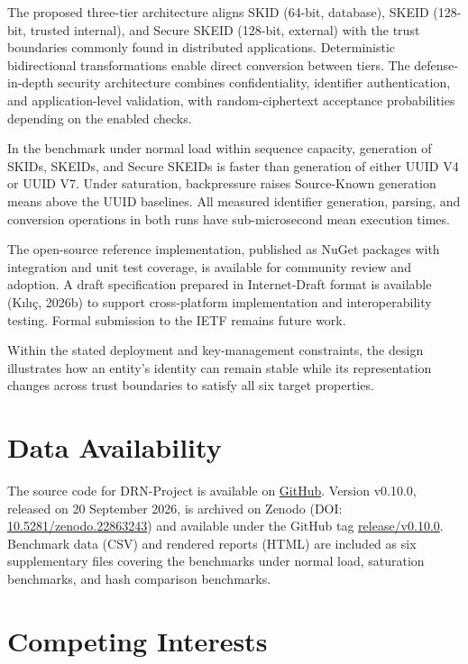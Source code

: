 \documentclass[fleqn,10pt]{wlpeerj}
\begin{document}
The proposed three-tier architecture aligns SKID (64-bit, database),
SKEID (128-bit, trusted internal), and Secure SKEID (128-bit, external)
with the trust boundaries commonly found in distributed applications.
Deterministic bidirectional transformations enable direct conversion
between tiers. The defense-in-depth security architecture combines
confidentiality, identifier authentication, and application-level
validation, with random-ciphertext acceptance probabilities depending on
the enabled checks.

In the benchmark under normal load within sequence capacity, generation
of SKIDs, SKEIDs, and Secure SKEIDs is faster than generation of either
UUID V4 or UUID V7. Under saturation, backpressure raises Source-Known
generation means above the UUID baselines. All measured identifier
generation, parsing, and conversion operations in both runs have
sub-microsecond mean execution times.

The open-source reference implementation, published as NuGet packages
with integration and unit test coverage, is available for community
review and adoption. A draft specification prepared in Internet-Draft
format is available (Kılıç, 2026b) to support cross-platform
implementation and interoperability testing. Formal submission to the
IETF remains future work.

Within the stated deployment and key-management constraints, the design
illustrates how an entity's identity can remain stable while its
representation changes across trust boundaries to satisfy all six target
properties.

\section*{Data Availability}\label{data-availability}

The source code for DRN-Project is available on
\href{https://github.com/duranserkan/DRN-Project}{GitHub}. Version
v0.10.0, released on 20 September 2026, is archived on Zenodo (DOI:
\href{https://doi.org/10.5281/zenodo.22863243}{10.5281/zenodo.22863243})
and available under the GitHub tag
\href{https://github.com/duranserkan/DRN-Project/tree/release/v0.10.0}{release/v0.10.0}.
Benchmark data (CSV) and rendered reports (HTML) are included as six
supplementary files covering the benchmarks under normal load,
saturation benchmarks, and hash comparison benchmarks.

\section*{Competing Interests}\label{competing-interests}
\end{document}
